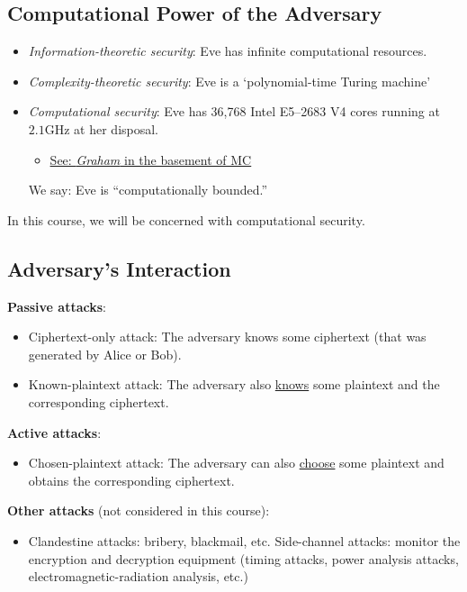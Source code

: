\subsection*{Computational Power of the Adversary}
\begin{itemize}
      \item \emph{Information-theoretic security}: Eve has infinite computational resources.
      \item \emph{Complexity-theoretic security}: Eve is a `polynomial-time Turing machine'
      \item \emph{Computational security}: Eve has 36,768 Intel E5--2683
            V4 cores running at $2.1 \text{GHz}$ at her disposal.
            \begin{itemize}
                  \item \href{https://docs.computecanada.ca/wiki/Graham}{
                              See: \emph{Graham} in the basement of MC}
            \end{itemize}
            We say: Eve is ``computationally bounded.''
\end{itemize}
In this course, we will be concerned with computational security.

\subsection*{Adversary's Interaction}
\textbf{Passive attacks}:
\begin{itemize}
      \item Ciphertext-only attack: The adversary knows some ciphertext (that was generated by Alice or Bob).
      \item Known-plaintext attack: The adversary also \underline{knows}
            some plaintext and the corresponding ciphertext.
\end{itemize}

\textbf{Active attacks}:
\begin{itemize}
      \item Chosen-plaintext attack: The adversary can also \underline{choose} some
            plaintext and obtains the corresponding ciphertext.
\end{itemize}
\textbf{Other attacks} (not considered in this course):
\begin{itemize}
      \item Clandestine attacks: bribery, blackmail, etc. Side-channel attacks: monitor the encryption and decryption equipment
            (timing attacks, power analysis attacks, electromagnetic-radiation analysis, etc.)
\end{itemize}

